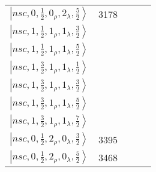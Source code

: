 \documentclass[twocolumn,superscriptaddress,preprintnumbers,nofootinbib]{revtex4}
\begin{document}
\begin{table*}[htbp]
\begin{tabular}{ccccc}
$\left| nsc,0, \frac{1}{2},0_{\rho},2_{\lambda}, \frac{5}{2} \right\rangle  $& 3178& & &  \\
 $\left| nsc,1, \frac{1}{2},1_{\rho},1_{\lambda}, \frac{3}{2} \right\rangle  $& & & &  \\
$\left| nsc,1, \frac{1}{2},1_{\rho},1_{\lambda}, \frac{5}{2} \right\rangle  $& & & &  \\
 $\left| nsc,1, \frac{3}{2},1_{\rho},1_{\lambda}, \frac{1}{2} \right\rangle  $& & & &  \\
 $\left| nsc,1, \frac{3}{2},1_{\rho},1_{\lambda}, \frac{3}{2} \right\rangle  $& & & &  \\
 $\left| nsc,1, \frac{3}{2},1_{\rho},1_{\lambda}, \frac{5}{2} \right\rangle  $& & & &  \\
 $\left| nsc,1, \frac{3}{2},1_{\rho},1_{\lambda}, \frac{7}{2} \right\rangle  $& & & &  \\
 $\left| nsc,0, \frac{1}{2},2_{\rho},0_{\lambda}, \frac{3}{2} \right\rangle  $&3395 & & &  \\
$\left| nsc,0, \frac{1}{2},2_{\rho},0_{\lambda}, \frac{5}{2} \right\rangle  $&3468 & & &  \\

\hline
\hline
\end{tabular}
\label{tab:widthsXic}
\end{table*}
\end{document}

